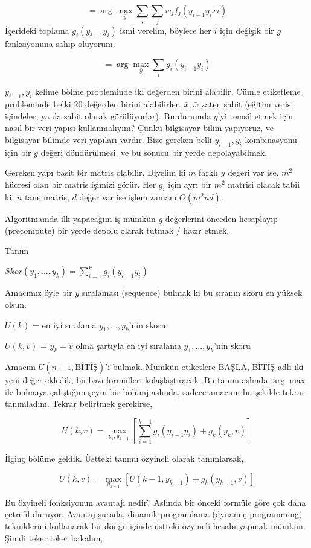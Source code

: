 \documentclass[12pt,fleqn]{article}\usepackage{../../common}
\begin{document}
$$ = \arg\max_{\bar{y}}  \sum_i  \sum_j w_j f_j(y_{i-1}y_i \bar{x} i )$$
İçerideki toplama $g_i(y_{i-1}y_i)$ ismi verelim, böylece her $i$ için
değişik bir $g$ fonksiyonuna sahip oluyorum. 

$$  = \arg\max_{\bar{y}}  \sum_i  g_i(y_{i-1}y_i) $$

$y_{i-1},y_i$ kelime bölme probleminde iki değerden birini alabilir. Cümle
etiketleme probleminde belki 20 değerden birini alabilirler. $\bar{x},\bar{w}$ zaten 
sabit (eğitim verisi içindeler, ya da sabit olarak görülüyorlar). Bu 
durumda $g$'yi temsil etmek için nasıl bir veri yapısı kullanmalıyım? Çünkü
bilgisayar bilim yapıyoruz, ve bilgisayar bilimde veri yapıları vardır. 
Bize gereken belli $y_{i-1},y_i$ kombinasyonu için bir $g$ değeri
döndürülmesi, ve bu sonucu bir yerde depolayabilmek.

Gereken yapı basit bir matris olabilir. Diyelim ki $m$ farklı $y$ değeri
var ise, $m^2$ hücresi olan bir matris işimizi görür. Her $g_i$ için ayrı
bir $m^2$ matrisi olacak tabii ki. $n$ tane matris, $d$ değer var ise 
işlem zamanı $O(m^2nd)$. 

Algoritmamda ilk yapacağım iş mümkün $g$ değerlerini önceden hesaplayıp
(precompute) bir yerde depolu olarak tutmak / hazır etmek. 

Tanım

$Skor(y_1,...,y_k) = \sum _{i=1}^{k} g_i(y_{i-1} y_i)$

Amacımız öyle bir $y$ sıralaması (sequence) bulmak ki bu sıranın skoru 
en yüksek olsun. 

$U(k)$ = en iyi sıralama $y_1,...,y_k$'nin skoru

$U(k,v)$ = $y_k=v$ olma şartıyla en iyi sıralama $y_1,...,y_k$'nin skoru

Amacım $U(n+1, \textrm{BİTİŞ})$'i bulmak. Mümkün etiketlere BAŞLA, BİTİŞ adlı iki
yeni değer ekledik, bu bazı formülleri kolaşlaştıracak. Bu tanım aslında
$\arg\max$ ile bulmaya çalıştığım şeyin bir bölümj aslında, sadece amacımı
bu şekilde tekrar tanımladım. Tekrar belirtmek gerekirse, 

$$U(k,v) = \max_{y_1,y_{k-1}}  [ \sum _{ i=1}^{k-1}  g_i(y_{i-1}y_i) +  g_k(y_k,v) ]$$

İlginç bölüme geldik. Üstteki tanımı özyineli olarak tanımlarsak, 

$$ U(k,v) = \max_{y_{k-1}} [ U({k-1},y_{k-1}) + g_k(y_{k-1},v)]  $$

Bu özyineli fonksiyonun avantajı nedir? Aslında bir önceki formüle göre çok
daha çetrefil duruyor. Avantaj şurada, dinamik programlama (dynamiç
programming) tekniklerini kullanarak bir döngü içinde üstteki özyineli
hesabı yapmak mümkün. Şimdi teker teker bakalım,
\end{document}

